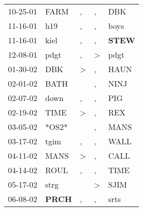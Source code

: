 \begin{supertabular}{p{0.07\textwidth}p{0.06\textwidth}p{0.02\textwidth}p{0.02\textwidth}p{0.06\textwidth}}
          10-25-01\textsuperscript{} &           FARM\textsuperscript{} &                , &                , &            DBK\textsuperscript{} \\
          11-16-01\textsuperscript{} &            h19\textsuperscript{} &                , &                , &           boys\textsuperscript{} \\
          11-16-01\textsuperscript{} &           kiel\textsuperscript{} &                , &                , &  \textbf{STEW\textsuperscript{}} \\
          12-08-01\textsuperscript{} &           pdgt\textsuperscript{} &                , &     \textgreater &           pdgt\textsuperscript{} \\
          01-30-02\textsuperscript{} &            DBK\textsuperscript{} &     \textgreater &                , &           HAUN\textsuperscript{} \\
          02-01-02\textsuperscript{} &           BATH\textsuperscript{} &                  &                , &           NINJ\textsuperscript{} \\
          02-07-02\textsuperscript{} &           down\textsuperscript{} &                , &                , &            PIG\textsuperscript{} \\
          02-19-02\textsuperscript{} &           TIME\textsuperscript{} &     \textgreater &                , &            REX\textsuperscript{} \\
          03-05-02\textsuperscript{} &                            *OS2* &                  &                , &           MANS\textsuperscript{} \\
          03-17-02\textsuperscript{} &           tgim\textsuperscript{} &                , &                , &           WALL\textsuperscript{} \\
          04-11-02\textsuperscript{} &           MANS\textsuperscript{} &     \textgreater &                , &           CALL\textsuperscript{} \\
          04-14-02\textsuperscript{} &           ROUL\textsuperscript{} &                , &                , &           TIME\textsuperscript{} \\
          05-17-02\textsuperscript{} &           strg\textsuperscript{} &                  &     \textgreater &           SJIM\textsuperscript{} \\
          06-08-02\textsuperscript{} &  \textbf{PRCH\textsuperscript{}} &                , &                , &           srts\textsuperscript{} \\

\end{supertabular}
